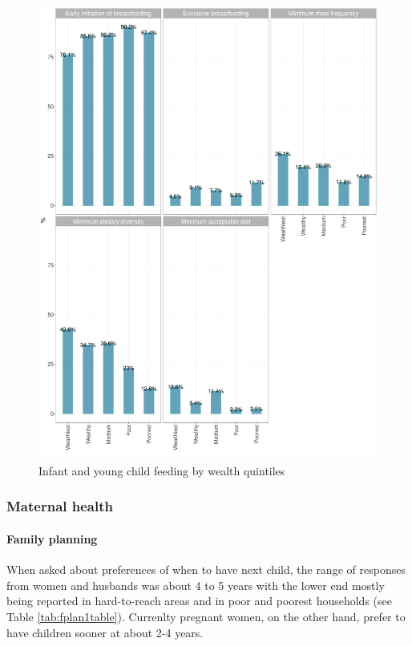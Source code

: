 \documentclass[12pt,a4paper]{article}
\let\oldparagraph\paragraph
\renewcommand{\paragraph}[1]{\oldparagraph{#1}\mbox{}}
\begin{document}
\begin{figure}[H]

{\centering \includegraphics{kayinReport_files/figure-latex/iycf2plot-1} 

}

\caption{Infant and young child feeding by wealth quintiles}\label{fig:iycf2plot}
\end{figure}

\hypertarget{mhealth-results}{%
\subsubsection{Maternal health}\label{mhealth-results}}

\hypertarget{fplan-results}{%
\paragraph{Family planning}\label{fplan-results}}

When asked about preferences of when to have next child, the range of responses from women and husbands was about 4 to 5 years with the lower end mostly being reported in hard-to-reach areas and in poor and poorest households (see Table \ref{tab:fplan1table}). Currenlty pregnant women, on the other hand, prefer to have children sooner at about 2-4 years.
\end{document}
